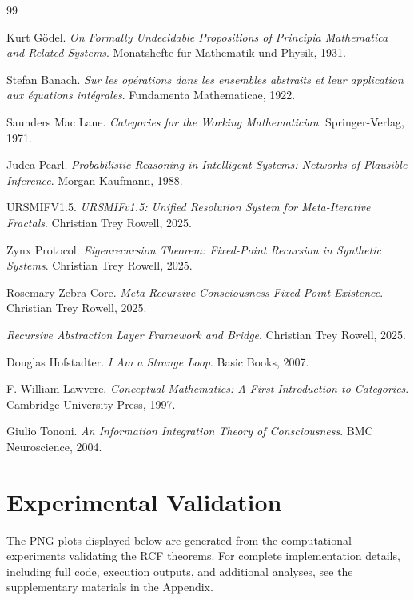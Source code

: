\documentclass[12pt]{article}
\begin{document}
\begin{thebibliography}{99}

Kurt G\"{o}del.
\textit{On Formally Undecidable Propositions of Principia Mathematica and Related Systems}.
Monatshefte f\"{u}r Mathematik und Physik, 1931.

Stefan Banach.
\textit{Sur les op\'{e}rations dans les ensembles abstraits et leur application aux \'{e}quations int\'{e}grales}.
Fundamenta Mathematicae, 1922.

Saunders Mac Lane.
\textit{Categories for the Working Mathematician}.
Springer-Verlag, 1971.

Judea Pearl.
\textit{Probabilistic Reasoning in Intelligent Systems: Networks of Plausible Inference}.
Morgan Kaufmann, 1988.

URSMIFV1.5.
\textit{URSMIFv1.5: Unified Resolution System for Meta-Iterative Fractals}.
Christian Trey Rowell, 2025.

Zynx Protocol.
\textit{Eigenrecursion Theorem: Fixed-Point Recursion in Synthetic Systems}.
Christian Trey Rowell, 2025.

Rosemary-Zebra Core.
\textit{Meta-Recursive Consciousness Fixed-Point Existence}.
Christian Trey Rowell, 2025.

\textit{Recursive Abstraction Layer Framework and Bridge}.
Christian Trey Rowell, 2025.

Douglas Hofstadter.
\textit{I Am a Strange Loop}.
Basic Books, 2007.

F. William Lawvere.
\textit{Conceptual Mathematics: A First Introduction to Categories}.
Cambridge University Press, 1997.

Giulio Tononi.
\textit{An Information Integration Theory of Consciousness}.
BMC Neuroscience, 2004.

\end{thebibliography}

\section{Experimental Validation}

The PNG plots displayed below are generated from the computational experiments validating the RCF theorems. For complete implementation details, including full code, execution outputs, and additional analyses, see the supplementary materials in the Appendix.
\end{document}
